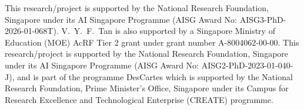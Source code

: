 \documentclass{article}
\theoremstyle{plain}
\theoremstyle{definition}
\theoremstyle{remark}
\begin{document}
This research/project is supported by the National Research Foundation, Singapore under its AI Singapore Programme (AISG Award No: AISG3-PhD-2026-01-068T). V.~Y.~F.~Tan is also supported by
a Singapore Ministry of Education (MOE) AcRF Tier 2 grant under grant number A-8004062-00-00.
This research/project is supported by the National Research Foundation, Singapore under its AI Singapore Programme (AISG Award No: AISG2-PhD-2023-01-040-J), and is part of the programme DesCartes which is supported by the National Research Foundation, Prime Minister’s Office, Singapore under its Campus for Research Excellence and Technological Enterprise (CREATE) programme.

\newpage




\appendix

\onecolumn


\end{document}

